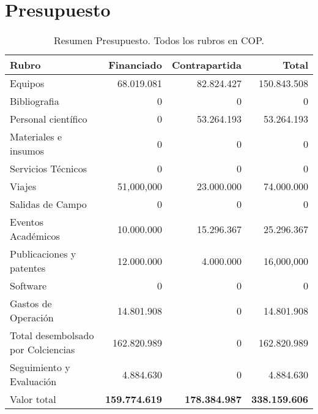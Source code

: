 
\section{Presupuesto}

\begin{table}[h]
\begin{center}
\begin{tabular}{|l|r|r|r|}\hline
\textbf{Rubro} 	& {\bf Financiado} & {\bf Contrapartida} & {\bf Total}\\\hline 
Equipos	& 68.019.081 &	82.824.427 &	150.843.508\\\hline
Bibliografia	&0	&0	&0 \\\hline
Personal científico	&0	&53.264.193	&53.264.193\\\hline
Materiales e insumos	&0	&0	&0\\\hline
Servicios Técnicos	&0	&0	&0\\\hline
Viajes	&51,000,000	&23.000.000	&74.000.000\\\hline
Salidas de Campo	&0	&0	&0\\\hline
Eventos Académicos	&10.000.000	&15.296.367	&25.296.367\\\hline
Publicaciones y patentes&	12.000.000	&4.000.000	&16,000,000\\\hline
Software&	0	&0	&0\\\hline
Gastos de Operación&	14.801.908	&0	&14.801.908\\\hline
Total desembolsado por Colciencias&	162.820.989	&0	&162.820.989\\\hline
Seguimiento y Evaluación&	 4.884.630	&0	&4.884.630\\\hline
Valor total&	{\bf 159.774.619}	& {\bf 178.384.987}	&{\bf 338.159.606}\\\hline

\end{tabular} 
\caption{Resumen Presupuesto. Todos los rubros en COP.}
\end{center}
\label{Resumen Presupuesto}
\end{table}


